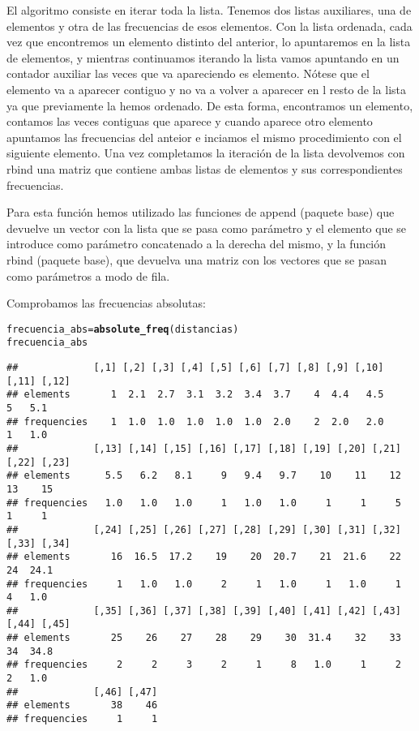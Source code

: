 \documentclass[12pt]{report}\usepackage[]{graphicx}\usepackage[dvipsnames]{xcolor}
\makeatletter
\newcommand{\hlstd}[1]{\textcolor[rgb]{0.345,0.345,0.345}{#1}}%
\newcommand{\hlkwb}[1]{\textcolor[rgb]{0.69,0.353,0.396}{#1}}%
\newcommand{\hlkwd}[1]{\textcolor[rgb]{0.737,0.353,0.396}{\textbf{#1}}}%
\newenvironment{kframe}{%
 \def\at@end@of@kframe{}%
 \ifinner\ifhmode%
  \def\at@end@of@kframe{\end{minipage}}%
  \begin{minipage}{\columnwidth}%
 \fi\fi%
 \def\FrameCommand##1{\hskip\@totalleftmargin \hskip-\fboxsep
 \colorbox{shadecolor}{##1}\hskip-\fboxsep
     \hskip-\linewidth \hskip-\@totalleftmargin \hskip\columnwidth}%
 \MakeFramed {\advance\hsize-\width
   \@totalleftmargin\z@ \linewidth\hsize
   \@setminipage}}%
 {\par\unskip\endMakeFramed%
 \at@end@of@kframe}
\newenvironment{knitrout}{}{} %
\makeatother
\begin{document}
			El algoritmo consiste en iterar toda la lista. Tenemos dos listas auxiliares, una de elementos y otra de las frecuencias de esos elementos. Con la lista ordenada, cada vez que encontremos un elemento distinto del anterior, lo apuntaremos en la lista de elementos, y mientras continuamos iterando la lista vamos apuntando en un contador auxiliar las veces que va apareciendo es elemento. Nótese que el elemento va a aparecer contiguo y no va a volver a aparecer en l resto de la lista ya que previamente la hemos ordenado. De esta forma, encontramos un elemento, contamos las veces contiguas que aparece y cuando aparece otro elemento apuntamos las frecuencias del anteior e inciamos el mismo procedimiento con el siguiente elemento. Una vez completamos la iteración de la lista devolvemos con rbind una matriz que contiene ambas listas de elementos y sus correspondientes frecuencias.
			
			Para esta función hemos utilizado las funciones de append (paquete base) que devuelve un vector con la lista que se pasa como parámetro y el elemento que se introduce como parámetro concatenado a la derecha del mismo, y la función rbind (paquete base), que devuelva una matriz con los vectores que se pasan como parámetros a modo de fila.
			
			Comprobamos las frecuencias absolutas:
			
\begin{knitrout}
\color{fgcolor}\begin{kframe}
\begin{alltt}
\hlstd{frecuencia_abs} \hlkwb{=} \hlkwd{absolute_freq}\hlstd{(distancias)}
\hlstd{frecuencia_abs}
\end{alltt}
\begin{verbatim}
##             [,1] [,2] [,3] [,4] [,5] [,6] [,7] [,8] [,9] [,10] [,11] [,12]
## elements       1  2.1  2.7  3.1  3.2  3.4  3.7    4  4.4   4.5     5   5.1
## frequencies    1  1.0  1.0  1.0  1.0  1.0  2.0    2  2.0   2.0     1   1.0
##             [,13] [,14] [,15] [,16] [,17] [,18] [,19] [,20] [,21] [,22] [,23]
## elements      5.5   6.2   8.1     9   9.4   9.7    10    11    12    13    15
## frequencies   1.0   1.0   1.0     1   1.0   1.0     1     1     5     1     1
##             [,24] [,25] [,26] [,27] [,28] [,29] [,30] [,31] [,32] [,33] [,34]
## elements       16  16.5  17.2    19    20  20.7    21  21.6    22    24  24.1
## frequencies     1   1.0   1.0     2     1   1.0     1   1.0     1     4   1.0
##             [,35] [,36] [,37] [,38] [,39] [,40] [,41] [,42] [,43] [,44] [,45]
## elements       25    26    27    28    29    30  31.4    32    33    34  34.8
## frequencies     2     2     3     2     1     8   1.0     1     2     2   1.0
##             [,46] [,47]
## elements       38    46
## frequencies     1     1
\end{verbatim}
\end{kframe}
\end{knitrout}
			
\end{document}
